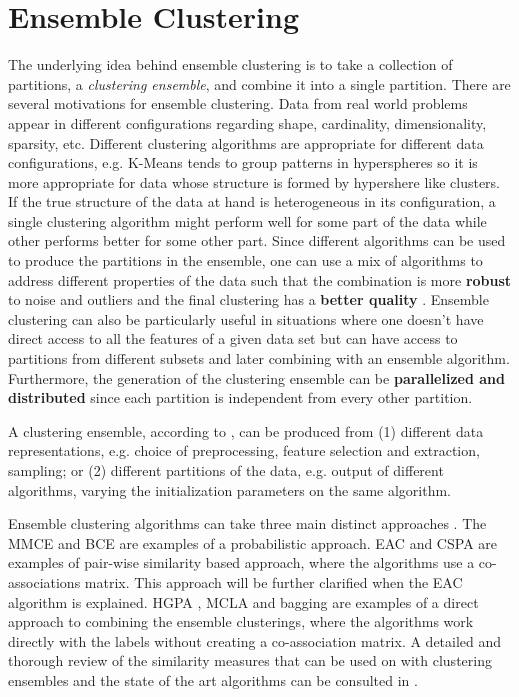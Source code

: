 %
%

\section{Ensemble Clustering}
\label{sec:ensemble}

The underlying idea behind ensemble clustering is to take a collection of partitions, a \emph{clustering ensemble}, and combine it into a single partition.
There are several motivations for ensemble clustering.
Data from real world problems appear in different configurations regarding shape, cardinality, dimensionality, sparsity, etc. 
Different clustering algorithms are appropriate for different data configurations, e.g. K-Means tends to group patterns in hyperspheres \cite{Jain1999} so it is more appropriate for data whose structure is formed by hypershere like clusters.
If the true structure of the data at hand is heterogeneous in its configuration, a single clustering algorithm might perform well for some part of the data while other performs better for some other part.
Since different algorithms can be used to produce the partitions in the ensemble, one can use a mix of algorithms to address different properties of the data such that the combination is more \textbf{robust} to noise and outliers \cite{topchy2004mixture} and the final clustering has a \textbf{better quality} \cite{Aggarwal2014}.
Ensemble clustering can also be particularly useful in situations where one doesn't have direct access to all the features of a given data set but can have access to partitions from different subsets and later combining with an ensemble algorithm.
Furthermore, the generation of the clustering ensemble can be \textbf{parallelized and distributed} since each partition is independent from every other partition.

A clustering ensemble, according to \cite{Fred2005}, can be produced from (1) different data representations, e.g. choice of preprocessing, feature selection and extraction, sampling; or (2) different partitions of the data, e.g. output of different algorithms, varying the initialization parameters on the same algorithm.

Ensemble clustering algorithms can take three main distinct approaches \cite{Aggarwal2014}.
The MMCE \cite{topchy2004mixture} and BCE \cite{wang2011bayesian} are examples of a probabilistic approach.
EAC \cite{Fred2005} and CSPA \cite{Strehl2002} are examples of pair-wise similarity based approach, where the algorithms use a co-associations matrix.
This approach will be further clarified when the EAC algorithm is explained.
HGPA \cite{Strehl2002}, MCLA \cite{Strehl2002} and bagging \cite{Dudoit2003} are examples of a direct approach to combining the ensemble clusterings, where the algorithms work directly with the labels without creating a co-association matrix.
A detailed and thorough review of the similarity measures that can be used on with clustering ensembles and the state of the art algorithms can be consulted in \cite{Aggarwal2014}.

